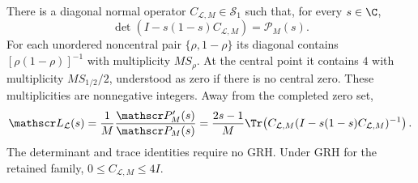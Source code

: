 \begin{proposition}
There is a diagonal normal operator $C_{\mathcal L,M}\in\mathcal S_1$
such that, for every $s\in\C$,
\begin{equation}\label{eq:DET18det}
 \det(I-s(1-s)C_{\mathcal L,M})=\mathscr P_M(s).
\end{equation}
For each unordered noncentral pair $\{\rho,1-\rho\}$ its diagonal
contains
$[\rho(1-\rho)]^{-1}$ with multiplicity $MS_\rho$.
At the central point it contains $4$ with multiplicity $MS_{1/2}/2$,
understood as zero if there is no central zero.
These multiplicities are nonnegative integers.
Away from the completed zero set,
\begin{equation}\label{eq:DET18resolvent}
 \mathscr L_{\mathcal L}(s)
 =\frac1M\frac{\mathscr P_M'(s)}{\mathscr P_M(s)}
 =\frac{2s-1}{M}
 \Tr\!\left(C_{\mathcal L,M}
 (I-s(1-s)C_{\mathcal L,M})^{-1}\right).
\end{equation}
The determinant and trace identities require no GRH. Under GRH for the
retained family, $0\le C_{\mathcal L,M}\le4I$.
\end{proposition}

